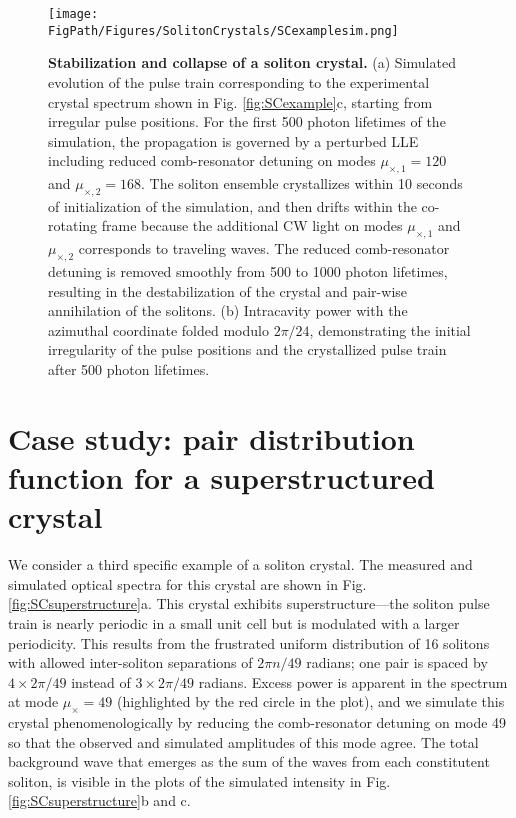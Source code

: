 
\begin{figure}[htpb]
	\begin{center}
		\texttt{[image: \\FigPath/Figures/SolitonCrystals/SCexamplesim.png]}
	\end{center}
	\caption[Stabilization and collapse of a soliton crystal]{\textbf{Stabilization and collapse of a soliton crystal.} (a) Simulated evolution of the pulse train corresponding to the experimental crystal spectrum shown in Fig. \ref{fig:SCexample}c, starting from irregular pulse positions. For the first 500 photon lifetimes of the simulation, the propagation is governed by a perturbed LLE including reduced comb-resonator detuning on modes $\mu_{\times,1}=120$ and $\mu_{\times,2}=168$. The soliton ensemble crystallizes within 10 seconds of initialization of the simulation, and then drifts within the co-rotating frame because the additional CW light on modes $\mu_{\times,1}$ and $\mu_{\times,2}$ corresponds to traveling waves. The reduced comb-resonator detuning is removed smoothly from 500 to 1000 photon lifetimes, resulting in the destabilization of the crystal and pair-wise annihilation of the solitons. (b) Intracavity power with the azimuthal coordinate folded modulo $2\pi/24$, demonstrating the initial irregularity of the pulse positions and the crystallized pulse train after 500 photon lifetimes.}
	\label{fig:SCexamplesim}
\end{figure} 


\section{Case study: pair distribution function for a superstructured crystal}

We consider a third specific example of a soliton crystal. The measured and simulated optical spectra for this crystal are shown in Fig. \ref{fig:SCsuperstructure}a. This crystal exhibits superstructure---the soliton pulse train is nearly periodic in a small unit cell but is modulated with a larger periodicity. This results from the frustrated uniform distribution of 16 solitons with allowed inter-soliton separations of $2\pi n/49$ radians; one pair is spaced by $4 \times 2\pi/49$ instead of $3 \times 2\pi/49$ radians.  Excess power is apparent in the spectrum at mode $\mu_\times=49$ (highlighted by the red circle in the plot), and we simulate this crystal phenomenologically by reducing the comb-resonator detuning on mode 49 so that the observed and simulated amplitudes of this mode agree. The total background wave that emerges as the sum of the waves from each constitutent soliton, is visible in the plots of the simulated intensity in Fig. \ref{fig:SCsuperstructure}b and c.

